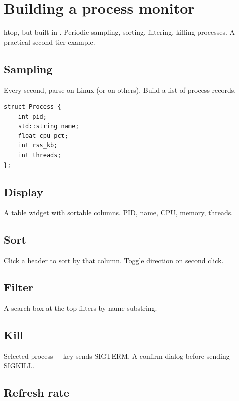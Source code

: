 \chapter{Building a process monitor}
\label{ch:procmon}

\begin{aside}
htop, but built in \maya{}. Periodic sampling, sorting,
filtering, killing processes. A practical second-tier
example.
\end{aside}

\section{Sampling}

Every second, parse  on Linux (or  on
others). Build a list of process records.

\begin{lstlisting}
struct Process {
    int pid;
    std::string name;
    float cpu_pct;
    int rss_kb;
    int threads;
};
\end{lstlisting}

\section{Display}

A table widget with sortable columns. PID, name, CPU,
memory, threads.

\section{Sort}

Click a header to sort by that column. Toggle direction
on second click.

\section{Filter}

A search box at the top filters by name substring.

\section{Kill}

Selected process +  key sends SIGTERM. A confirm
dialog before sending SIGKILL.

\section{Refresh rate}

